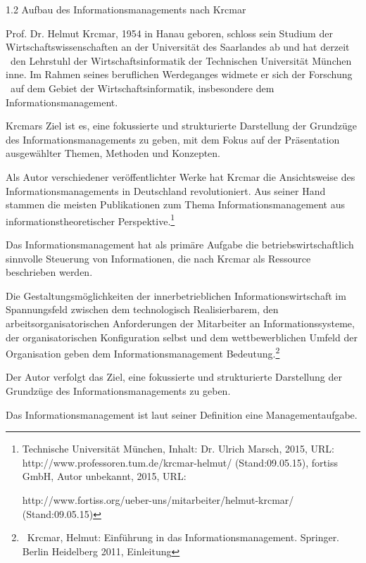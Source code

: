 \documentclass{article}
\title{}
\begin{document}
1.2 Aufbau des Informationsmanagements nach Krcmar \newline


Prof. Dr. Helmut Krcmar, 1954 in Hanau geboren, schloss sein Studium der Wirtschaftswissenschaften an der Universität
des Saarlandes ab und hat derzeit \ den Lehrstuhl der Wirtschaftsinformatik der Technischen Universität München inne.
Im Rahmen seines beruflichen Werdeganges widmete er sich der Forschung \ auf dem Gebiet der Wirtschaftsinformatik,
insbesondere dem Informationsmanagement.

Krcmars Ziel ist es, eine fokussierte und strukturierte Darstellung der Grundzüge des Informationsmanagements zu geben,
mit dem Fokus auf der Präsentation ausgewählter Themen, Methoden und Konzepten.


\bigskip

Als Autor verschiedener veröffentlichter Werke hat Krcmar die Ansichtsweise des Informationsmanagements in Deutschland
revolutioniert. Aus seiner Hand stammen die meisten Publikationen zum Thema Informationsmanagement aus
informationstheoretischer Perspektive.\footnote{Technische Universität München, Inhalt: Dr. Ulrich Marsch, 2015, URL:
http://www.professoren.tum.de/krcmar-helmut/ (Stand:09.05.15), \newline
fortiss GmbH, Autor unbekannt, 2015, URL: \par http://www.fortiss.org/ueber-uns/mitarbeiter/helmut-krcmar/
(Stand:09.05.15)}


\bigskip

Das Informationsmanagement hat als primäre Aufgabe die betriebswirtschaftlich sinnvolle Steuerung von Informationen, die
nach Krcmar als Ressource beschrieben werden.

Die Gestaltungsmöglichkeiten der innerbetrieblichen Informationswirtschaft im Spannungsfeld zwischen dem technologisch
Realisierbarem, den arbeitsorganisatorischen Anforderungen der Mitarbeiter an Informationssysteme, der
organisatorischen Konfiguration selbst und dem wettbewerblichen Umfeld der Organisation geben dem
Informationsmanagement Bedeutung.\footnote{\ Krcmar, Helmut: Einführung in das Informationsmanagement. Springer. Berlin
Heidelberg 2011, Einleitung}


\bigskip


\bigskip

Der Autor verfolgt das Ziel, eine fokussierte und strukturierte Darstellung der Grundzüge des Informationsmanagements zu
geben.

Das Informationsmanagement ist laut seiner Definition eine Managementaufgabe.
\end{document}
